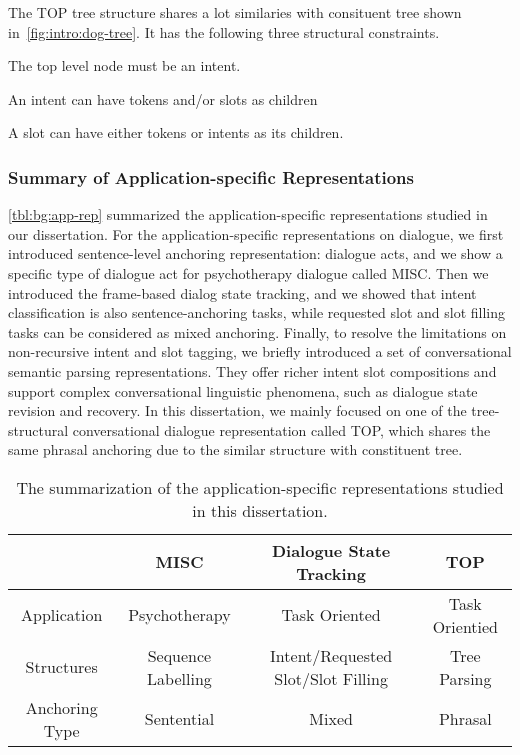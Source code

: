 The TOP tree structure shares a lot similaries with consituent tree
shown in~\autoref{fig:intro:dog-tree}. It has the following three structural
constraints.
\begin{inparaenum}[(1)]
\item The top level node must be an intent.
\item An intent can have tokens and/or slots as children
\item A slot can have either tokens or intents as its children.
\end{inparaenum}

\subsubsection{Summary of Application-specific Representations}
\label{ssec:bg:summary-application-rep}
\autoref{tbl:bg:app-rep} summarized the application-specific
representations studied in our dissertation. For the application-specific
representations on dialogue, we first introduced sentence-level
anchoring representation: dialogue acts, and we show a specific type
of dialogue act for psychotherapy dialogue called MISC. Then we
introduced the frame-based dialog state tracking, and we showed that
intent classification is also sentence-anchoring tasks, while
requested slot and slot filling tasks can be considered as mixed
anchoring. Finally, to resolve the limitations on non-recursive intent
and slot tagging, we briefly introduced a set of conversational
semantic parsing representations. They offer richer intent slot
compositions and support complex conversational linguistic phenomena,
such as dialogue state revision and recovery.  In this dissertation, we
mainly focused on one of the tree-structural conversational dialogue
representation called TOP, which shares the same phrasal anchoring due
to the similar structure with constituent tree.

\begin{table}[!tbp]
\caption{The summarization of the application-specific representations studied in this dissertation.}
\label{tbl:bg:app-rep}
  \begin{center}
\setlength{\tabcolsep}{4pt}
{\small
\begin{tabular}{c|c|c|c}
  \toprule
  \hline
  & {\bf MISC}               & {\bf Dialogue State Tracking}            & {\bf TOP}            \\ \hline
  Application    & Psychotherapy      & Task Oriented                      & Task Orientied \\
  Structures     & Sequence Labelling & Intent/Requested Slot/Slot Filling & Tree Parsing   \\
  Anchoring Type & Sentential         & Mixed                              & Phrasal        \\
  \hline
  \bottomrule

\end{tabular}}
\end{center}
\label{tbl:bg:app-rep}
\end{table}



